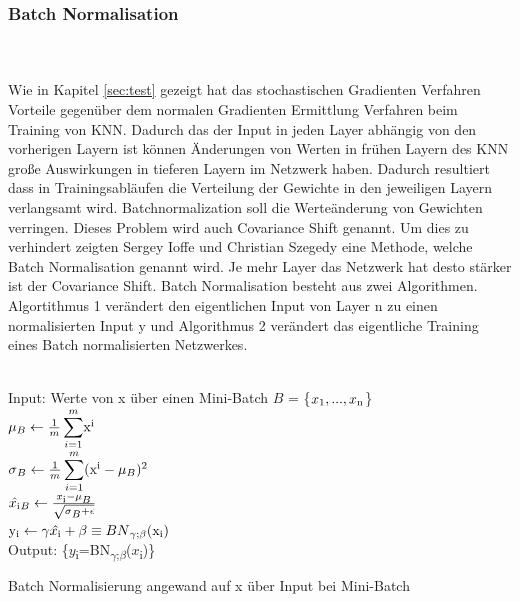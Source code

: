 \documentclass{llncs}
\begin{document}
\subsubsection{Batch Normalisation}
~\\\\
Wie in Kapitel \ref{sec:test} gezeigt hat das stochastischen Gradienten Verfahren Vorteile gegenüber dem normalen Gradienten Ermittlung Verfahren beim Training von KNN. Dadurch das der Input in jeden Layer abhängig von den vorherigen Layern ist können Änderungen von Werten in frühen Layern des KNN große Auswirkungen in tieferen Layern im Netzwerk haben.
Dadurch resultiert dass in Trainingsabläufen die Verteilung der Gewichte in den jeweiligen Layern verlangsamt wird. Batchnormalization soll die Werteänderung von Gewichten verringen. Dieses Problem wird auch Covariance Shift genannt. Um dies zu verhindert zeigten Sergey Ioffe und Christian Szegedy \cite{batchnorm} eine Methode, welche Batch Normalisation genannt wird. Je mehr Layer das Netzwerk hat desto stärker ist der Covariance Shift. Batch Normalisation besteht aus zwei Algorithmen. Algortithmus 1 verändert den eigentlichen Input von Layer n zu einen normalisierten Input y und Algorithmus 2 verändert das eigentliche Training eines Batch normalisierten Netzwerkes\cite{batchnorm}.
\\\\
\begin{algorithm}[H]
	Input: Werte von x über einen Mini-Batch $B$ = \{$x\textsubscript{1},...,x\textsubscript{n}$\}\\
	\begin{math}
	\mu\textsubscript{$B$}\leftarrow\frac{1}{m}\displaystyle\sum_{i=1}^{m}$x$\textsuperscript{i}
	\end{math}\\
	\begin{math}
	\sigma\textsubscript{$B$}\leftarrow\frac{1}{m}\displaystyle\sum_{i=1}^{m}($x$\textsuperscript{i} - \mu\textsubscript{$B$})\textsuperscript{2}
	\end{math}\\
	\begin{math}
	\hat{x\textsubscript{i}}\textsubscript{$B$}\leftarrow\frac{x\textsubscript{i}-\mu\textsubscript{$B$}}{\sqrt{\sigma\textsubscript{$B$} + \epsilon}}
	\end{math}\\
	\begin{math}
	$y$\textsubscript{i}\leftarrow\gamma\hat{x\textsubscript{i}} + \beta \equiv BN\textsubscript{$\gamma$;$\beta$}($x$\textsubscript{i})
	\end{math}\\
	Output: \{$y$\textsubscript{i}=BN\textsubscript{$\gamma$;$\beta$}($x$\textsubscript{i})\}
	\caption{Batch Normalisierung angewand auf x über Input bei Mini-Batch  }	
\end{algorithm}
\end{document}
